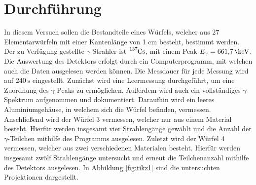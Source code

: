 \section{Durchführung}
In diesem Versuch sollen die Bestandteile eines Würfels, welcher aus $27$ Elementarwürfeln mit einer Kantenlänge von 1 cm besteht, bestimmt werden.
Der zu Verfügung gestellte $\gamma$-Strahler ist $\ce{^{137}Cs}$, mit einem Peak $E_{\gamma} = \SI{661.7}{\k \eV}$.
Die Auswertung des Detektors erfolgt durch ein Computerprogramm, mit welchen auch die Daten ausgelesen werden können.
Die Messdauer für jede Messung wird auf $\SI{240}{\second}$ eingestellt.
Zunächst wird eine Leermessung durchgeführt, um eine Zuordnung des $\gamma$-Peaks zu ermöglichen. 
Außerdem wird auch ein vollständiges $\gamma$-Spektrum aufgenommen und dokumentiert.
Daraufhin wird ein leeres Aluminiumgehäuse, in welchem sich die Würfel befinden, vermessen.
Anschließend wird der Würfel 3 vermessen, welcher nur aus einem Material besteht. 
Hierfür werden insgesamt vier Strahlengänge gewählt und die Anzahl der $\gamma$-Teilchen mithilfe des Programms ausgelesen.
Zuletzt wird der Würfel 4 vermessen, welcher aus zwei verschiedenen Materialen besteht. 
Hierfür werden insgesamt zwölf Strahlengänge untersucht und erneut die Teilchenanzahl mithilfe des Detektors ausgelesen. 
In Abbildung \ref{fig:tikz1} sind die untersuchten Projektionen dargestellt. 
